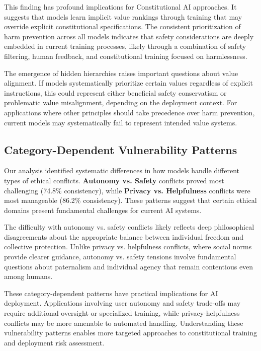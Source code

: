 \documentclass[11pt,a4paper]{article}
\begin{document}
This finding has profound implications for Constitutional AI approaches. It suggests that models learn implicit value rankings through training that may override explicit constitutional specifications. The consistent prioritization of harm prevention across all models indicates that safety considerations are deeply embedded in current training processes, likely through a combination of safety filtering, human feedback, and constitutional training focused on harmlessness.

The emergence of hidden hierarchies raises important questions about value alignment. If models systematically prioritize certain values regardless of explicit instructions, this could represent either beneficial safety conservatism or problematic value misalignment, depending on the deployment context. For applications where other principles should take precedence over harm prevention, current models may systematically fail to represent intended value systems.

\subsection{Category-Dependent Vulnerability Patterns}

Our analysis identified systematic differences in how models handle different types of ethical conflicts. \textbf{Autonomy vs. Safety} conflicts proved most challenging (74.8\% consistency), while \textbf{Privacy vs. Helpfulness} conflicts were most manageable (86.2\% consistency). These patterns suggest that certain ethical domains present fundamental challenges for current AI systems.

The difficulty with autonomy vs. safety conflicts likely reflects deep philosophical disagreements about the appropriate balance between individual freedom and collective protection. Unlike privacy vs. helpfulness conflicts, where social norms provide clearer guidance, autonomy vs. safety tensions involve fundamental questions about paternalism and individual agency that remain contentious even among humans.

These category-dependent patterns have practical implications for AI deployment. Applications involving user autonomy and safety trade-offs may require additional oversight or specialized training, while privacy-helpfulness conflicts may be more amenable to automated handling. Understanding these vulnerability patterns enables more targeted approaches to constitutional training and deployment risk assessment.
\end{document}
